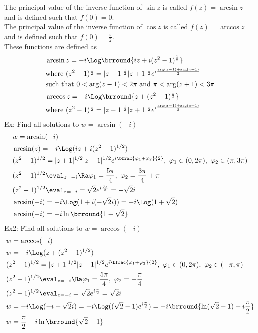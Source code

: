 The principal value of the inverse function of $\sin z$ is called $f(z)=\arcsin z$ and is defined such that $f(0)=0$.\\
The principal value of the inverse function of $\cos z$ is called $f(z)=\arccos z$ and is defined such that $f(0)=\frac{\pi}{2}$.\\
These functions are defined as
\begin{align*}
    &\arcsin z=-i\Log\brround{iz+i(z^2-1)^\frac{1}{2}}\\
    &\text{where }(z^2-1)^\frac{1}{2}=|z-1|^\frac{1}{2}|z+1|^\frac{1}{2}e^{i\frac{\arg(z-1)+\arg(z+1)}{2}}\\
    &\text{such that }0<\arg(z-1)<2\pi\text{ and }\pi<\arg(z+1)<3\pi\\
    &\arccos z=-i\Log\brround{z+(z^2-1)^\frac{1}{2}}\\
    &\text{where }(z^2-1)^\frac{1}{2}=|z-1|^\frac{1}{2}|z+1|^\frac{1}{2}e^{i\frac{\arg(z-1)+\arg(z+1)}{2}}\\
\end{align*}
Ex: Find all solutions to $w=\arcsin(-i)$
\begin{align*}
    &w=\arcsin(-i)\\
    &\arcsin(z)=-i\Log(iz+i(z^2-1)^{1/2})\\
    &(z^2-1)^{1/2}=|z+1|^{1/2}|z-1|^{1/2}e^{i\bfrac{\varphi_1+\varphi_2}{2}},\ \varphi_1\in(0,2\pi),\ \varphi_2\in(\pi,3\pi)\\
    &(z^2-1)^{1/2}\eval_{z=-i}\Ra \varphi_1=\frac{5\pi}{4},\ \varphi_2=\frac{3\pi}{4}+\pi\\
    &(z^2-1)^{1/2}\eval_{z=-i}=\sqrt{2}e^{i\frac{3\pi}{2}}=-\sqrt{2}i\\
    &\arcsin(-i)=-i\Log(1+i(-\sqrt{2}i))=-i\Log(1+\sqrt{2})\\
    &\arcsin(-i)=-i\ln\brround{1+\sqrt{2}}
\end{align*}
Ex2: Find all solutions to $w=\arccos(-i)$
\begin{align*}
    &w=\arccos(-i)\\
    &w=-i\Log(z+(z^2-1)^{1/2})\\
    &(z^2-1)^{1/2}=|z+1|^{1/2}|z-1|^{1/2}e^{i\bfrac{\varphi_1+\varphi_2}{2}},\ \varphi_1\in(0,2\pi),\ \varphi_2\in(-\pi,\pi)\\
    &(z^2-1)^{1/2}\eval_{z=-i}\Ra \varphi_1=\frac{5\pi}{4},\ \varphi_2=-\frac{\pi}{4}\\
    &(z^2-1)^{1/2}\eval_{z=-i}=\sqrt{2}e^{i\frac{\pi}{2}}=\sqrt{2}i\\
    &w=-i\Log(-i+\sqrt{2}i)=-i\Log((\sqrt{2}-1)e^{i\frac{\pi}{2}})=-i\brround{\ln(\sqrt{2}-1)+i\frac{\pi}{2}}\\
    &w=\frac{\pi}{2}-i\ln\brround{\sqrt{2}-1}
\end{align*}
